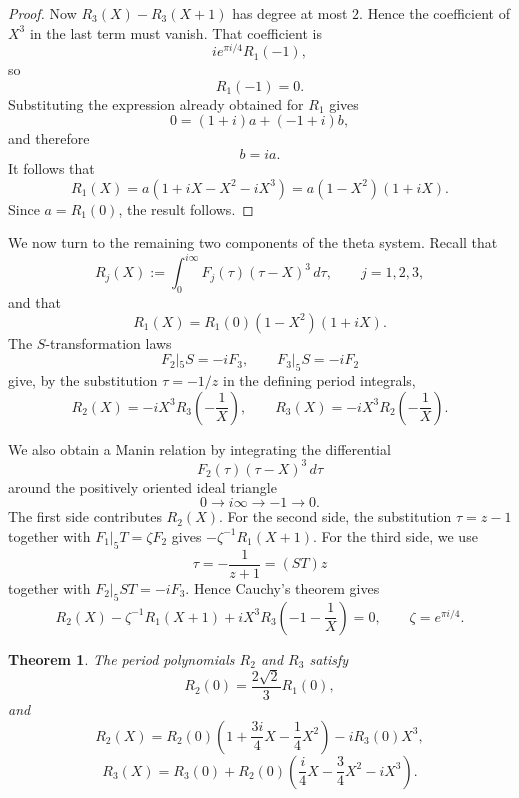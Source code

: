 \documentclass[preprint,12pt]{elsarticle}
\newtheorem{theorem}{Theorem}[section]
\theoremstyle{definition}
\theoremstyle{remark}
\begin{document}
\begin{proof}
		Now $R_3(X)-R_3(X+1)$ has degree at most $2$.  Hence the coefficient of $X^3$ in the last term must vanish.  That coefficient is
		\[
		ie^{\pi i/4}R_1(-1),
		\]
		so
		\[
		R_1(-1)=0.
		\]
		Substituting the expression already obtained for $R_1$ gives
		\[
		0=(1+i)a+(-1+i)b,
		\]
		and therefore
		\[
		b=ia.
		\]
		It follows that
		\[
		R_1(X)=a(1+iX-X^2-iX^3)=a(1-X^2)(1+iX).
		\]
		Since $a=R_1(0)$, the result follows.
	\end{proof}
	

	
We now turn to the remaining two components of the theta system.  Recall that
	\[
	R_j(X):=\int_0^{i\infty}F_j(\tau)(\tau-X)^3\,d\tau,\qquad j=1,2,3,
	\]
	and that
	\[
	R_1(X)=R_1(0)(1-X^2)(1+iX).
	\]
	The $S$-transformation laws
	\[
	F_2|_5S=-iF_3,\qquad F_3|_5S=-iF_2
	\]
	give, by the substitution $\tau=-1/z$ in the defining period integrals,
	\[
	R_2(X)=-iX^3R_3\left(-\frac{1}{X}\right),\qquad
	R_3(X)=-iX^3R_2\left(-\frac{1}{X}\right).
	\]
	
	We also obtain a Manin relation by integrating the differential
	\[
	F_2(\tau)(\tau-X)^3\,d\tau
	\]
	around the positively oriented ideal triangle
	\[
	0\longrightarrow i\infty\longrightarrow -1\longrightarrow 0.
	\]
	The first side contributes $R_2(X)$.  For the second side, the
	substitution $\tau=z-1$ together with $F_1|_5T=\zeta F_2$ gives
	$-\zeta^{-1}R_1(X+1)$.  For the third side, we use
	\[
	\tau=-\frac{1}{z+1}=(ST)z
	\]
	together with $F_2|_5ST=-iF_3$.  Hence Cauchy's theorem gives
	\[
	R_2(X)-\zeta^{-1}R_1(X+1)
	+iX^3R_3\left(-1-\frac{1}{X}\right)=0,
	\qquad
	\zeta=e^{\pi i/4}.
	\]
	
	\begin{theorem}
		The period polynomials $R_2$ and $R_3$ satisfy
		\[
		R_2(0)=\frac{2\sqrt{2}}{3}R_1(0),
		\]
		and
		\[
		R_2(X)=R_2(0)\left(1+\frac{3i}{4}X-\frac{1}{4}X^2\right)-iR_3(0)X^3,
		\]
		\[
		R_3(X)=R_3(0)+R_2(0)\left(\frac{i}{4}X-\frac{3}{4}X^2-iX^3\right).
		\]
	\end{theorem}
	
\end{document}
